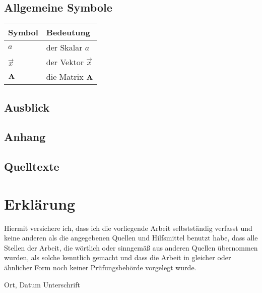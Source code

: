 \section*{Allgemeine Symbole}\label{s.sym.alg}
\begin{flushleft}\begin{tabularx}{\textwidth}{l|X}
Symbol & Bedeutung\\\hline
$a$ & der Skalar $a$ \\
$\vec{x}$ & der Vektor $\vec{x}$\\
${\textbf{A}}$ & die Matrix ${\textbf{A}}$\\
\end{tabularx}\end{flushleft}
\section{Ausblick}

\begin{landscape}\begin{multicols}{2}
\appendix
\chapter{Anhang}
\section{Quelltexte}
\end{multicols}\end{landscape}






\chapter*{Erklärung}

Hiermit versichere ich, dass ich die vorliegende Arbeit selbstständig verfasst und keine anderen als die angegebenen Quellen und Hilfsmittel benutzt habe, dass alle Stellen der Arbeit, die wörtlich oder sinngemäß aus anderen Quellen übernommen wurden, als solche kenntlich gemacht und dass die Arbeit in gleicher oder ähnlicher Form noch keiner Prüfungsbehörde vorgelegt wurde.

\vspace{3cm}
Ort, Datum \hspace{5cm} Unterschrift\\

